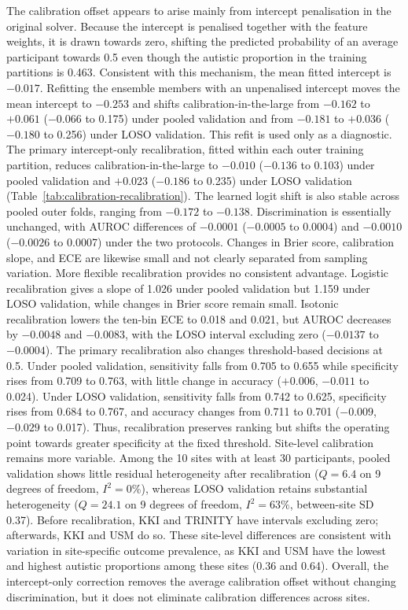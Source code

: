 The calibration offset appears to arise mainly from intercept penalisation in the original solver. Because the intercept is penalised together with the feature weights, it is drawn towards zero, shifting the predicted probability of an average participant towards 0.5 even though the autistic proportion in the training partitions is 0.463. Consistent with this mechanism, the mean fitted intercept is $-0.017$. Refitting the ensemble members with an unpenalised intercept moves the mean intercept to $-0.253$ and shifts calibration-in-the-large from $-0.162$ to $+0.061$ ($-0.066$ to 0.175) under pooled validation and from $-0.181$ to $+0.036$ ($-0.180$ to 0.256) under LOSO validation. This refit is used only as a diagnostic. The primary intercept-only recalibration, fitted within each outer training partition, reduces calibration-in-the-large to $-0.010$ ($-0.136$ to 0.103) under pooled validation and $+0.023$ ($-0.186$ to 0.235) under LOSO validation (Table~\ref{tab:calibration-recalibration}). The learned logit shift is also stable across pooled outer folds, ranging from $-0.172$ to $-0.138$. Discrimination is essentially unchanged, with AUROC differences of $-0.0001$ ($-0.0005$ to 0.0004) and $-0.0010$ ($-0.0026$ to 0.0007) under the two protocols. Changes in Brier score, calibration slope, and ECE are likewise small and not clearly separated from sampling variation. More flexible recalibration provides no consistent advantage. Logistic recalibration gives a slope of 1.026 under pooled validation but 1.159 under LOSO validation, while changes in Brier score remain small. Isotonic recalibration lowers the ten-bin ECE to 0.018 and 0.021, but AUROC decreases by $-0.0048$ and $-0.0083$, with the LOSO interval excluding zero ($-0.0137$ to $-0.0004$). The primary recalibration also changes threshold-based decisions at 0.5. Under pooled validation, sensitivity falls from 0.705 to 0.655 while specificity rises from 0.709 to 0.763, with little change in accuracy ($+0.006$, $-0.011$ to 0.024). Under LOSO validation, sensitivity falls from 0.742 to 0.625, specificity rises from 0.684 to 0.767, and accuracy changes from 0.711 to 0.701 ($-0.009$, $-0.029$ to 0.017). Thus, recalibration preserves ranking but shifts the operating point towards greater specificity at the fixed threshold. Site-level calibration remains more variable. Among the 10 sites with at least 30 participants, pooled validation shows little residual heterogeneity after recalibration ($Q=6.4$ on 9 degrees of freedom, $I^2=0\%$), whereas LOSO validation retains substantial heterogeneity ($Q=24.1$ on 9 degrees of freedom, $I^2=63\%$, between-site SD 0.37). Before recalibration, KKI and TRINITY have intervals excluding zero; afterwards, KKI and USM do so. These site-level differences are consistent with variation in site-specific outcome prevalence, as KKI and USM have the lowest and highest autistic proportions among these sites (0.36 and 0.64). Overall, the intercept-only correction removes the average calibration offset without changing discrimination, but it does not eliminate calibration differences across sites.

